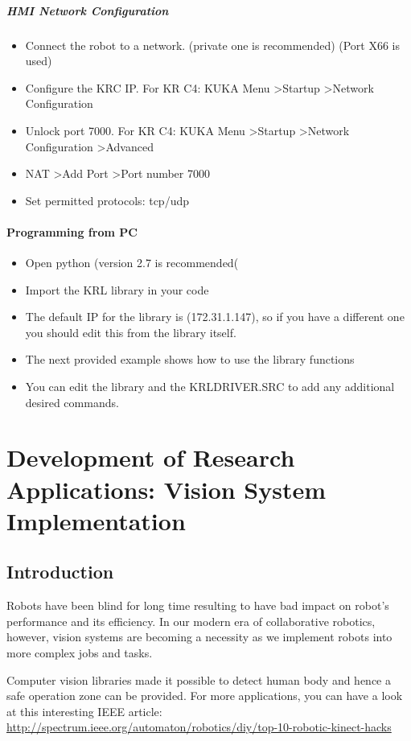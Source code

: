 \subparagraph{HMI Network Configuration}
\begin{itemize}
	\item Connect the robot to a network. (private one is recommended) (Port X66 is used)
	\item Configure the KRC IP. For KR C4: KUKA Menu \textgreater Startup \textgreater Network Configuration
	\item Unlock port 7000. For KR C4: KUKA Menu \textgreater Startup \textgreater Network Configuration \textgreater Advanced
	\item NAT \textgreater Add Port \textgreater Port number 7000
	\item Set permitted protocols: tcp/udp
	
\end{itemize}
\paragraph{Programming from PC }
\begin{itemize}
	\item Open python (version 2.7 is recommended(
	\item Import the KRL library in your code 
	\item The default IP for the library is (172.31.1.147), so if you have a different one you should edit this from the library itself. 
	\item The next provided example shows how to use the library functions 
	\item You can edit the library and the KRLDRIVER.SRC to add any additional desired commands.
\end{itemize}
\newpage
\section{Development of Research Applications: Vision System Implementation}
\subsection{Introduction}
Robots have been blind for long time resulting to have bad impact on robot's performance and its efficiency. In our modern era of collaborative robotics, however, vision systems are becoming a necessity as we implement robots into more complex jobs and tasks.


Computer vision libraries made it possible to detect human body and hence a safe operation zone can be provided. For more applications, you can have a look at this interesting IEEE article:
\url{http://spectrum.ieee.org/automaton/robotics/diy/top-10-robotic-kinect-hacks} 

